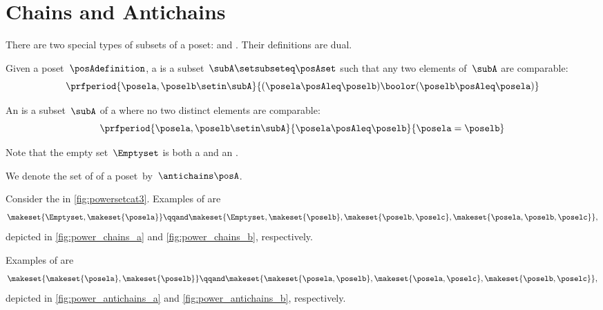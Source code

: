 
\section{Chains and Antichains}
\label{sec:chains-antichains}

There are two special types of subsets of a poset:  and .
Their definitions are dual.

\begin{definition}
    \label{def:chain}
    Given a poset~$\posAdefinition$, a  is a subset~$\subA \setsubseteq \posAset$ such that any two elements of~$\subA$ are comparable:
    \begin{equation}\label{eq:chain}
        \prfperiod{
            \posela,\poselb \setin \subA
        }{
            (\posela \posAleq \poselb) \boolor (\poselb \posAleq \posela)
        }
    \end{equation}
\end{definition}

\begin{definition}
    \label{def:antichain}
    An  is a subset~$\subA$ of a  where no two distinct elements are comparable:
    \begin{equation}\label{eq:antichain}
        \prfperiod{
            \posela, \poselb \setin \subA
        }{
            \posela \posAleq \poselb
        }{
            \posela = \poselb
        }
    \end{equation}
\end{definition}
\begin{remark}
    Note that the empty set~$\Emptyset$ is both a  and an .
\end{remark}

We denote the set of  of a poset~\posA by~$\antichains\posA$.

\begin{example}
    Consider the  in \cref{fig:powersetcat3}.
    Examples of  are
    \begin{equation}\label{eq:example-chain}
        \makeset{\Emptyset,\makeset{\posela}}
        \qqand
        \makeset{\Emptyset,\makeset{\poselb},\makeset{\poselb,\poselc},\makeset{\posela,\poselb,\poselc}},
    \end{equation}
    depicted in \cref{fig:power_chains_a} and \cref{fig:power_chains_b}, respectively.

    Examples of  are
    \begin{equation}\label{eq:examples-antichain}
        \makeset{\makeset{\posela},\makeset{\poselb}}
        \qqand
        \makeset{\makeset{\posela,\poselb}, \makeset{\posela,\poselc}, \makeset{\poselb,\poselc}},
    \end{equation}
    depicted in \cref{fig:power_antichains_a} and \cref{fig:power_antichains_b}, respectively.
\end{example}

